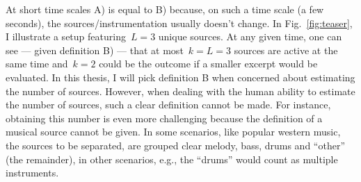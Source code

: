 At short time scales A) is equal to B) because, on such a time scale (a few seconds), the sources/instrumentation usually doesn't change. 
In Fig.~\ref{fig:teaser}, I illustrate a setup featuring~$L=3$ unique sources.
At any given time, one can see --- given definition B) --- that at most~$k=L=3$ sources are active at the same time and~$k=2$ could be the outcome if a smaller excerpt would be evaluated.
In this thesis, I will pick definition B when concerned about estimating the number of sources.
However, when dealing with the human ability to estimate the number of sources, such a clear definition cannot be made.
For instance, obtaining this number is even more challenging because the definition of a musical source cannot be given.
In some scenarios, like popular western music, the sources to be separated, are grouped clear melody, bass, drums and ``other'' (the remainder), in other scenarios, e.g., the ``drums'' would count as multiple instruments.



